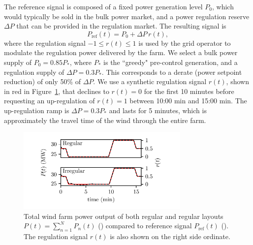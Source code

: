 The reference signal is composed of a fixed power generation level $P_0$, which would typically be sold in the bulk power market, and a power regulation reserve $\Delta P$ that can be provided in the regulation market. The resulting signal is
\begin{equation}
P_\text{ref}(t) = P_0 + \Delta P \, r(t),
\end{equation} 
where the regulation signal \mbox{$-1 \le r(t) \le 1$} is used by the grid operator to modulate the regulation power delivered by the farm. We select a bulk power supply of \mbox{$P_0 =  0.85P_*$}, where $P_*$ is the ``greedy" pre-control generation, and a regulation supply of $\Delta P = 0.3P_*$. This corresponds to a derate (power setpoint reduction) of only 50\% of $\Delta P$. We use a synthetic regulation signal $r(t)$, shown in red in Figure~\ref{fig:Pref}, that declines to $r(t)=0$ for the first 10 minutes before requesting an up-regulation of $r(t) = 1$ between 10:00 min and 15:00 min. The up-regulation ramp is $\Delta P = 0.3P_*$ and lasts for 5 minutes, which is approximately the travel time of the wind through the entire farm.

\begin{figure}[thpb]
\begin{center}
\includegraphics[width=0.75\textwidth]{./fig/Pref.pdf}
\vspace{-3em}
\end{center}
\caption{\label{fig:Pref}Total wind farm power output of both regular and regular layouts \mbox{$P(t) = \sum_{n=1}^N P_n(t)$} (\broken) compared to reference signal $P_\text{ref}(t)$ ({\color{red}\full}). The regulation signal $r(t)$ is also shown on the right side ordinate.}
\end{figure}


